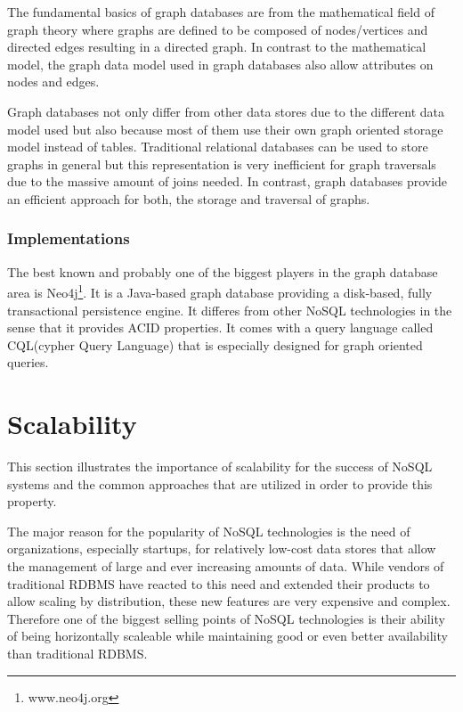 \documentclass{sig-alternate}
\begin{document}
The fundamental basics of graph databases are from the mathematical field of graph theory where graphs are defined to be composed of nodes/vertices and directed edges resulting in a directed graph. In contrast to the mathematical model, the graph data model used in graph databases also allow attributes on nodes and edges.

Graph databases not only differ from other data stores due to the different data model used but also because most of them use their own graph oriented storage model instead of tables. Traditional relational databases can be used to store graphs in general but this representation is very inefficient for graph traversals due to the massive amount of joins needed\cite{vicknair:mysql_vs_graphs}. In contrast, graph databases provide an efficient approach for both, the storage and traversal of graphs.


\subsubsection{Implementations}

The best known and probably one of the biggest players in the graph database area is Neo4j\footnote{www.neo4j.org}.
It is a Java-based graph database providing a disk-based, fully transactional persistence engine. It differes from other NoSQL technologies in the sense that it provides ACID properties. It comes with a query language called CQL(cypher Query Language) that is especially designed for graph oriented queries.

\section{Scalability}

This section illustrates the importance of scalability for the success of NoSQL systems and the common approaches that are utilized in order to provide this property.

The major reason for the popularity of NoSQL technologies is the need of organizations, especially startups, for relatively low-cost data stores that allow the management of large and ever increasing amounts of data. While vendors of traditional RDBMS have reacted to this need and extended their products to allow scaling by distribution, these new features are very expensive and complex.
Therefore one of the biggest selling points of NoSQL technologies is their ability of being horizontally scaleable while maintaining good or even better availability than traditional RDBMS.
\end{document}
